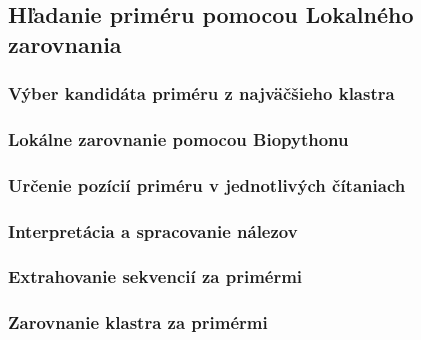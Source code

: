 \subsection{Hľadanie priméru pomocou Lokalného zarovnania}

\subsubsection{Výber kandidáta priméru z najväčšieho klastra}


\subsubsection{Lokálne zarovnanie pomocou Biopythonu}


\subsubsection{Určenie pozícií priméru v jednotlivých čítaniach}


\subsubsection{Interpretácia a spracovanie nálezov}


\subsubsection{Extrahovanie sekvencií za primérmi}


\subsubsection{Zarovnanie klastra za primérmi}
